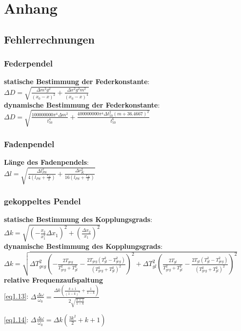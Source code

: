 \section{Anhang}
\label{anhang}
\subsection{Fehlerrechnungen}
\subsubsection{Federpendel}
\textbf{statische Bestimmung der Federkonstante}:\\
$\Delta D=\sqrt{\frac{\Delta m^2 g^2}{(x_0-x)^2}+\frac{\Delta x^2 g^2 m^2}{(x_0-x)^4}}$\\
\textbf{dynamische Bestimmung der Federkonstante}:\\
$\Delta D=\sqrt{\frac{100000000 \pi ^4 \Delta m^2}{t_{50}^4}+\frac{400000000 \pi ^4 \Delta t_{50}^2 (m+36.4667)^2}{t_{50}^6}}$\\
\subsubsection{Fadenpendel}
\textbf{Länge des Fadenpendels}:\\
$\Delta l= \sqrt{\frac{\Delta l_{PS}^2}{4 \left(l_{PS}+\frac{r_K}{2}\right)}+\frac{\Delta r_K^2}{16 \left(l_{PS}+\frac{r_K}{2}\right)}}$
\subsubsection{gekoppeltes Pendel}
\textbf{statische Bestimmung des Kopplungsgrads}:\\
$\Delta k=\sqrt{(-\frac{x_2}{x_1^2}\Delta x_1)^2+(\frac{\Delta x_2}{x_1})^2}$\\
\textbf{dynamische Bestimmung des Kopplungsgrads}:\\
$\Delta k=$$\sqrt{\Delta T_{geg}^2 \left(-\frac{2 T_{geg}}{T_{geg}^2+T_{gl}^2}-\frac{2 T_{geg} \left(T_{gl}^2-T_{geg}^2\right)}{\left(T_{geg}^2+T_{gl}^2\right)^2}\right)^2+\Delta T_{gl}^2 \left(\frac{2 T_{gl}}{T_{geg}^2+T_{gl}^2}-\frac{2 T_{gl} \left(T_{gl}^2-T_{geg}^2\right)}{\left(T_{geg}^2+T_{gl}^2\right)^2}\right)^2}$\\
\textbf{relative Frequenzaufspaltung}\\

\cref{eq1.13}: $\Delta \frac{\Delta \omega}{\omega_0}=\frac{\Delta k \left(\frac{k+1}{(1-k)^2}+\frac{1}{1-k}\right)}{2 \sqrt{\frac{k+1}{1-k}}}$

\cref{eq1.14}: $\Delta \frac{\Delta \omega}{\omega_0}=\Delta k \left(\frac{3 k^2}{2}+k+1\right)$\\


